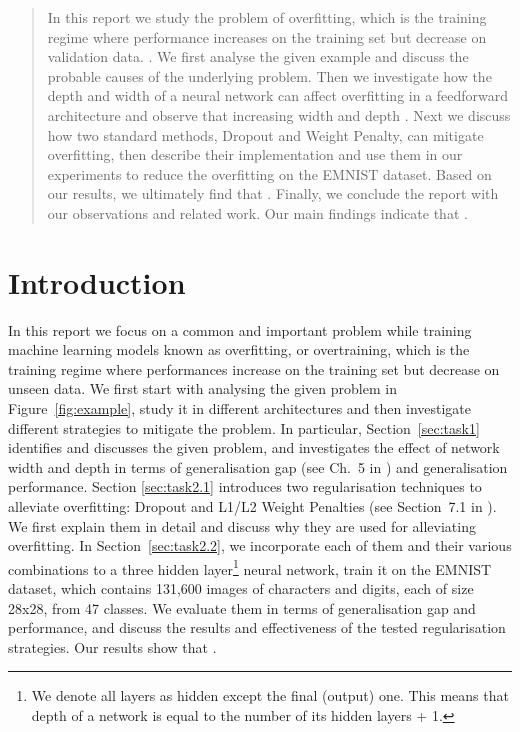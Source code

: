 \documentclass{article}
\begin{document}
 



\begin{abstract} 
In this report we study the problem of overfitting, which is the training regime where performance increases on the training set but decrease on validation data. \questionOne.
We first analyse the given example and discuss the probable causes of the underlying problem. 
Then we investigate how the depth and width of a neural network can affect overfitting in a feedforward architecture and observe that increasing width and depth \questionTwo.
Next we discuss how two standard methods, Dropout and Weight Penalty, can
mitigate overfitting, then describe their implementation and use them in our experiments
to reduce the overfitting on the EMNIST dataset. 
Based on our results, we ultimately find that \questionThree.
Finally, we conclude the report with our observations and related work. 
Our main findings indicate that \questionFour.
\end{abstract} 


\section{Introduction}
\label{sec:intro}
In this report we focus on a common and important problem while training machine learning models known as overfitting, or overtraining, which is the training regime where performances increase on the training set but decrease on unseen data.
We first start with analysing the given problem in Figure~\ref{fig:example}, study it in different architectures and then investigate different strategies to mitigate the problem.
In particular, Section~\ref{sec:task1} identifies and discusses the given problem, and investigates the effect of network width and depth in terms of generalisation gap (see Ch.~5 in \citealt{Goodfellow-et-al-2016}) and generalisation performance.
Section \ref{sec:task2.1} introduces two regularisation techniques to alleviate overfitting: Dropout \cite{srivastava2014dropout} and L1/L2 Weight Penalties (see Section~7.1 in \citealt{Goodfellow-et-al-2016}). 
We first explain them in detail and discuss why they are used for alleviating overfitting.
In Section~\ref{sec:task2.2}, we incorporate each of them and their various combinations to a three hidden layer\footnote{We denote all layers as hidden except the final (output) one. This means that depth of a network is equal to the number of its hidden layers + 1.} neural network, train it on the EMNIST dataset, which contains 131,600 images of characters and digits, each of size 28x28, from 47 classes.
We evaluate them in terms of generalisation gap and performance, and discuss the results and effectiveness of the tested regularisation strategies.
Our results show that \questionThree.
\end{document}
